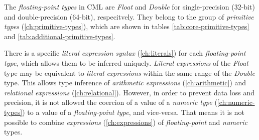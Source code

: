 The \emph{floating-point types} in CML are \emph{Float} and \emph{Double}
for single-precision (32-bit) and double-precision (64-bit), respecitvely.
They belong to the group of \emph{primitive types} (\ref{ch:primitive-types}),
which are shown in tables \ref{tab:core-primitive-types} and \ref{tab:additional-primitive-types}.

There is a specific \emph{literal expression syntax} (\ref{ch:literals})
for each \emph{floating-point type},
which allows them to be inferred uniquely.
\emph{Literal expressions} of the \emph{Float} type may be equivalent
to \emph{literal expressions} within the same range of the \emph{Double} type.
This allows type inference of \emph{arithmetic expressions} (\ref{ch:arithmetic})
and \emph{relational expressions} (\ref{ch:relational}).
However,
in order to prevent data loss and precision,
it is not allowed the coercion of a value of a \emph{numeric type}
(\ref{ch:numeric-types}) to a value of a \emph{floating-point type},
and vice-versa.
That means it is not possible to combine \emph{expressions} (\ref{ch:expressions})
of \emph{floating-point} and \emph{numeric} types.

